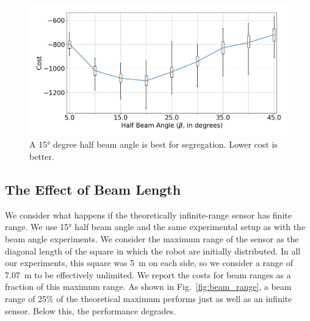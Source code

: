 \documentclass[letterpaper, 10 pt, conference]{ieeeconf}
\begin{document}
\begin{figure}[t]
  \centering
  \includegraphics[width=1\linewidth]{./images/beam_angle.png}
  \caption{A \ang{15} degree half beam angle is best for segregation. Lower cost is better.}
  \label{fig:beam_angle}
\end{figure}

\subsection{The Effect of Beam Length} \label{section:beam_range}

We consider what happens if the theoretically infinite-range sensor has finite
range. We use \ang{15} half beam angle and the same experimental setup as with
the beam angle experiments. We consider the maximum range of the sensor as the
diagonal length of the square in which the robot are initially distributed. In
all our experiments, this square was \SI{5}{\meter} on each side, so we consider
a range of \SI{7.07}{\meter} to be effectively unlimited. We report the costs
for beam ranges as a fraction of this maximum range. As shown in
Fig.~\ref{fig:beam_range}, a beam range of 25\% of the theoretical maximum
performs just as well as an infinite sensor. Below this, the performance
degrades.
\end{document}
